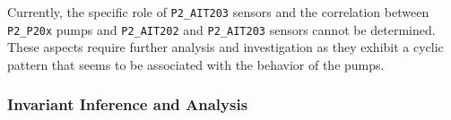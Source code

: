 		
		
		
		
		
		

\bigskip
Currently, the specific role of \texttt{P2\_AIT203} sensors and the correlation between \texttt{P2\_P20x} pumps and \texttt{P2\_AIT202} and \texttt{P2\_AIT203} sensors cannot be determined. These aspects require further analysis and investigation as they exhibit a cyclic pattern that seems to be associated with the behavior of the pumps.

\vfill

\subsubsection{Invariant Inference and Analysis}
\label{subsubsec:6_P1P2_invariants}

